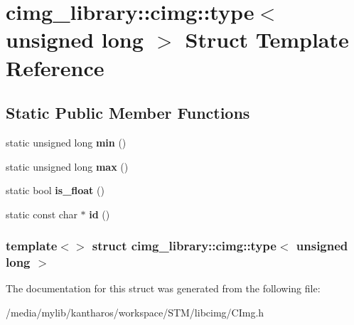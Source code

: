 \hypertarget{structcimg__library_1_1cimg_1_1type_3_01unsigned_01long_01_4}{
\section{cimg\_\-library::cimg::type$<$ unsigned long $>$ Struct Template Reference}
\label{structcimg__library_1_1cimg_1_1type_3_01unsigned_01long_01_4}
}
\subsection*{Static Public Member Functions}
\begin{DoxyCompactItemize}
\item 
\hypertarget{structcimg__library_1_1cimg_1_1type_3_01unsigned_01long_01_4_a50112343935a0241085a17034b55288c}{
static unsigned long {\bfseries min} ()}
\label{structcimg__library_1_1cimg_1_1type_3_01unsigned_01long_01_4_a50112343935a0241085a17034b55288c}

\item 
\hypertarget{structcimg__library_1_1cimg_1_1type_3_01unsigned_01long_01_4_a97dd1fea8097c42d17b0c273dd23bd53}{
static unsigned long {\bfseries max} ()}
\label{structcimg__library_1_1cimg_1_1type_3_01unsigned_01long_01_4_a97dd1fea8097c42d17b0c273dd23bd53}

\item 
\hypertarget{structcimg__library_1_1cimg_1_1type_3_01unsigned_01long_01_4_afd0c1907bd8f80509ee39c3649276320}{
static bool {\bfseries is\_\-float} ()}
\label{structcimg__library_1_1cimg_1_1type_3_01unsigned_01long_01_4_afd0c1907bd8f80509ee39c3649276320}

\item 
\hypertarget{structcimg__library_1_1cimg_1_1type_3_01unsigned_01long_01_4_a59e748398ca92e0357f129312d75257d}{
static const char $\ast$ {\bfseries id} ()}
\label{structcimg__library_1_1cimg_1_1type_3_01unsigned_01long_01_4_a59e748398ca92e0357f129312d75257d}

\end{DoxyCompactItemize}
\subsubsection*{template$<$$>$ struct cimg\_\-library::cimg::type$<$ unsigned long $>$}



The documentation for this struct was generated from the following file:\begin{DoxyCompactItemize}
\item 
/media/mylib/kantharos/workspace/STM/libcimg/CImg.h\end{DoxyCompactItemize}
